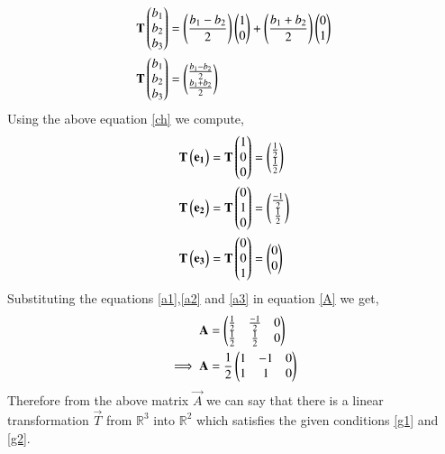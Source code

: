 \documentclass[journal,12pt,twocolumn]{IEEEtran}
\begin{document}
\begin{align}
        \mathbf{T}\begin{pmatrix}b_1\\b_2\\b_3\end{pmatrix}&=\left(\frac{b_1-b_2}{2}\right)\begin{pmatrix}1\\0\end{pmatrix}+\left(\frac{b_1+b_2}{2}\right)\begin{pmatrix}0\\1\end{pmatrix}\\
        \mathbf{T}\begin{pmatrix}b_1\\b_2\\b_3\end{pmatrix}&=\begin{pmatrix}\frac{b_1-b_2}{2}\\\frac{b_1+b_2}{2}\end{pmatrix}\label{ch}
\end{align}
Using the above equation \eqref{ch} we compute,
\begin{align}
    \mathbf{T}\begin{pmatrix}\mathbf{e_1}\end{pmatrix}=\mathbf{T}\begin{pmatrix}1\\0\\0\end{pmatrix}&=\begin{pmatrix}\frac{1}{2}\\\frac{1}{2}\end{pmatrix}\label{a1}\\
    \mathbf{T}\begin{pmatrix}\mathbf{e_2}\end{pmatrix}=\mathbf{T}\begin{pmatrix}0\\1\\0\end{pmatrix}&=\begin{pmatrix}\frac{-1}{2}\\\frac{1}{2}\end{pmatrix}\label{a2}\\
    \mathbf{T}\begin{pmatrix}\mathbf{e_3}\end{pmatrix}=\mathbf{T}\begin{pmatrix}0\\0\\1\end{pmatrix}&=\begin{pmatrix}0\\0\end{pmatrix}\label{a3}
\end{align}
Substituting the equations \eqref{a1},\eqref{a2} and \eqref{a3} in equation \eqref{A} we get,
\begin{align}
    \mathbf{A}&=\begin{pmatrix}\frac{1}{2} & \frac{-1}{2} & 0\\\frac{1}{2} & \frac{1}{2} & 0\end{pmatrix}\\
   \implies \mathbf{A}&=\frac{1}{2}\begin{pmatrix}1 & -1 & 0\\1 & 1 & 0\end{pmatrix}
\end{align}
Therefore from the above matrix $\vec{A}$ we can say that there is a linear transformation $\vec{T}$ from $\mathbb{R}^3$ into $\mathbb{R}^2$ which satisfies the given conditions \eqref{g1} and \eqref{g2}.
\end{document}
